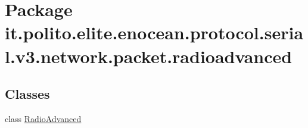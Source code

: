 \hypertarget{namespaceit_1_1polito_1_1elite_1_1enocean_1_1protocol_1_1serial_1_1v3_1_1network_1_1packet_1_1radioadvanced}{}\section{Package it.\+polito.\+elite.\+enocean.\+protocol.\+serial.\+v3.\+network.\+packet.\+radioadvanced}
\label{namespaceit_1_1polito_1_1elite_1_1enocean_1_1protocol_1_1serial_1_1v3_1_1network_1_1packet_1_1radioadvanced}
\subsection*{Classes}
\begin{DoxyCompactItemize}
\item 
class \hyperlink{classit_1_1polito_1_1elite_1_1enocean_1_1protocol_1_1serial_1_1v3_1_1network_1_1packet_1_1radioadvanced_1_1_radio_advanced}{Radio\+Advanced}
\end{DoxyCompactItemize}
